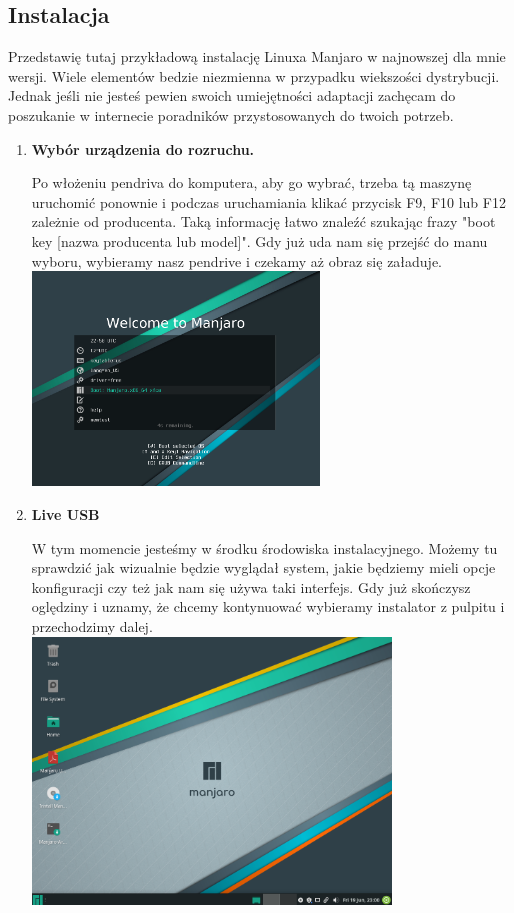 \documentclass[10pt,a4paper]{report}
\begin{document}
		\subsection{Instalacja}
		
Przedstawię tutaj przykładową instalację Linuxa Manjaro w najnowszej dla mnie wersji. Wiele elementów bedzie niezmienna w przypadku wiekszości dystrybucji. Jednak jeśli nie jesteś pewien swoich umiejętności adaptacji zachęcam do poszukanie w internecie poradników przystosowanych do twoich potrzeb.

\begin{enumerate}
\item \textbf{Wybór urządzenia do rozruchu.}\par
Po włożeniu pendriva do komputera, aby go wybrać, trzeba tą maszynę uruchomić ponownie i podczas uruchamiania klikać przycisk F9, F10 lub F12 zależnie od producenta. Taką informację łatwo znaleźć szukając frazy "boot key [nazwa producenta lub model]". Gdy już uda nam się przejść do manu wyboru, wybieramy nasz pendrive i czekamy aż obraz się załaduje.\\

\includegraphics[width=0.6\textwidth, center]{manjaro_install1.png}

\item \textbf{Live USB} \par
W tym momencie jesteśmy w środku środowiska instalacyjnego. Możemy tu sprawdzić jak wizualnie będzie wyglądał system, jakie będziemy mieli opcje konfiguracji czy też jak nam się używa taki interfejs. Gdy już skończysz oględziny i uznamy, że chcemy kontynuować wybieramy instalator z pulpitu i przechodzimy dalej.\\

\includegraphics[width=0.75\textwidth, center]{manjaro_install2.png}




\end{enumerate}
\end{document}

